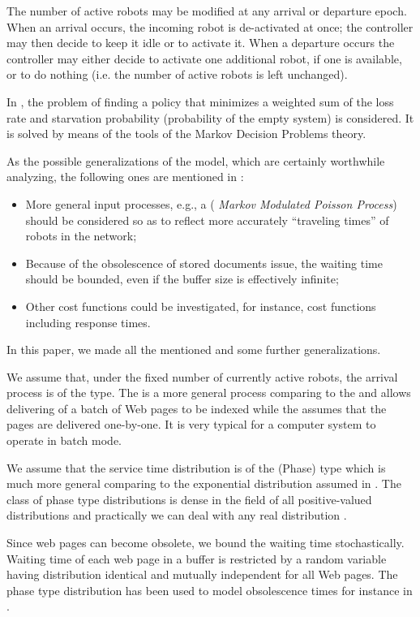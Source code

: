 \documentclass[11pt]{article}
\begin{document}
The number of active robots may be modified at any arrival or
departure epoch. When an arrival occurs, the incoming robot is
de-activated at once; the controller may then decide to keep it idle
or to activate it. When a departure occurs the controller may either
decide to activate one additional robot, if one is available, or to
do nothing (i.e. the number of active robots is left unchanged).

In \cite{tlnc}, the problem of finding a policy that minimizes a
weighted sum of the loss rate and starvation probability
(probability of the empty system) is considered. It is solved by
means of the tools of the Markov Decision Problems theory.

As the possible generalizations of the model, which are certainly
worthwhile analyzing, the following ones are mentioned in
\cite{tlnc}:
\begin{itemize}
\item[] More general input processes, e.g., a  ({\it
Markov Modulated Poisson Process}) should be considered so as to
reflect more accurately ``traveling times'' of robots in the network;
\item[] Because of the obsolescence of stored documents
issue, the waiting time should be bounded, even if the buffer size is
effectively infinite;
\item[] Other cost functions could be investigated, for
instance, cost functions including response times.
\end{itemize}

In this paper, we made all the mentioned and some further
generalizations.

We assume that, under the fixed number of currently active robots,
the arrival process is of the  type. The  is a more
general process comparing to the  and allows delivering of a
batch of Web pages to be indexed while the  assumes that the
pages are delivered one-by-one. It is very typical for a computer
system to operate in batch mode.

We assume that the service time distribution is of the  (Phase) 
type which is much more general comparing to the exponential distribution
assumed in \cite{tlnc}. The class of phase type distributions is
dense in the field of all positive-valued distributions and practically
we can deal with any real distribution \cite{ANO96}.

Since web pages can become obsolete, we bound the waiting time stochastically. 
Waiting time of each web page in a buffer is restricted by a random variable 
having  distribution identical and mutually independent for all Web pages.
The phase type distribution has been used to model obsolescence times
for instance in \cite{W87}.
\end{document}
